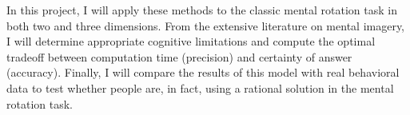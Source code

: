 \documentclass{article} %
\begin{document}
In this project, I will apply these methods to the classic mental
rotation task in both two and three dimensions. From the extensive
literature on mental imagery, I will determine appropriate cognitive
limitations and compute the optimal tradeoff between computation time
(precision) and certainty of answer (accuracy). Finally, I will
compare the results of this model with real behavioral data to test
whether people are, in fact, using a rational solution in the mental
rotation task.


\renewcommand\refname{\normalsize{References}}


\end{document}
